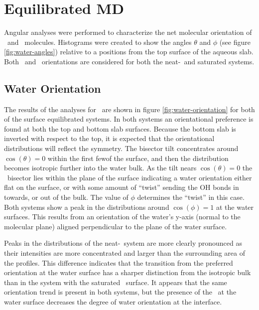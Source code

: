 \section{Equilibrated MD}

Angular analyses were performed to characterize the net molecular orientation of \wat~and \suldiox~molecules. Histograms were created to show the angles $\theta$ and $\phi$ (see figure \ref{fig:water-angles}) relative to a positions from the top surface of the aqueous slab. Both \wat~and \suldiox~orientations are considered for both the neat-\wat~and saturated systems.

\subsection{Water Orientation}

The results of the analyses for \wat~are shown in figure \ref{fig:water-orientation} for both of the surface equilibrated systems. In both systems an orientational preference is found at both the top and bottom slab surfaces. Because the bottom slab is inverted with respect to the top, it is expected that the orientational distributions will reflect the symmetry. The bisector tilt concentrates around $\cos(\theta)=0$ within the first few\angs of the surface, and then the distribution becomes isotropic further into the water bulk. As the tilt nears $\cos(\theta)=0$ the \wat~bisector lies within the plane of the surface indicating a water orientation either flat on the surface, or with some amount of ``twist'' sending the OH bonds in towards, or out of the bulk. The value of $\phi$ determines the ``twist'' in this case. Both systems show a peak in the distributions around $\cos(\phi)=1$ at the water surfaces. This results from an orientation of the water's y-axis (normal to the molecular plane) aligned perpendicular to the plane of the water surface.

Peaks in the distributions of the neat-\wat~system are more clearly pronounced as their intensities are more concentrated and larger than the surrounding area of the profiles. This difference indicates that the transition from the preferred orientation at the water surface has a sharper distinction from the isotropic bulk than in the system with the saturated \suldiox~surface. It appears that the same orientation trend is present in both systems, but the presence of the \suldiox~at the water surface decreases the degree of water orientation at the interface.

